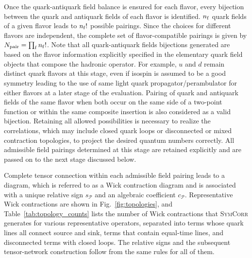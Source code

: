 \documentclass[a4paper,fleqn]{cas-dc}
\begin{document}
Once the quark-antiquark field balance is ensured for each flavor, every bijection between the quark and antiquark fields of each flavor is identified. $n_{\rm f}$ quark fields of a given flavor leads to $n_{\rm f}!$ possible pairings. Since the choices for different flavors are independent, the complete set of flavor-compatible pairings is given by $N_{\rm pair}=\prod_{\rm f} n_{\rm f}!$. Note that all quark-antiquark fields bijections generated are based on the flavor information explicitly specified in the elementary quark field objects that compose the hadronic operator. For example, $u$ and $d$ remain distinct quark flavors at this stage, even if isospin is assumed to be a good symmetry leading to the use of same light quark propagator/perambulator for either flavors at a later stage of the evaluation. Pairing of quark and antiquark fields of the same flavor when both occur on the same side of a two-point function or within the same composite insertion is also considered as a valid bijection. Retaining all allowed possibilities is necessary to realize the correlations, which may include closed quark loops or disconnected or mixed contraction topologies, to project the desired quantum numbers correctly. All admissible field pairings determined at this stage are retained explicitly and are passed on to the next stage discussed below. 

Complete tensor connection within each admissible field pairing leads to a diagram, which is referred to as a Wick contraction diagram and is associated with a unique relative sign $s_{\mathcal P}$ and an algebraic coefficient $c_{\mathcal P}$. Representative Wick contractions are shown in Fig.~\ref{fig:topologies}, and Table~\ref{tab:topology_counts} lists the number of Wick contractions that \textsc{SymCorr} generates for various representative operators, separated into terms whose quark lines all connect source and sink, terms that contain equal-time lines, and disconnected terms with closed loops. The relative signs and the subsequent tensor-network construction follow from the same rules for all of them.
\end{document}
